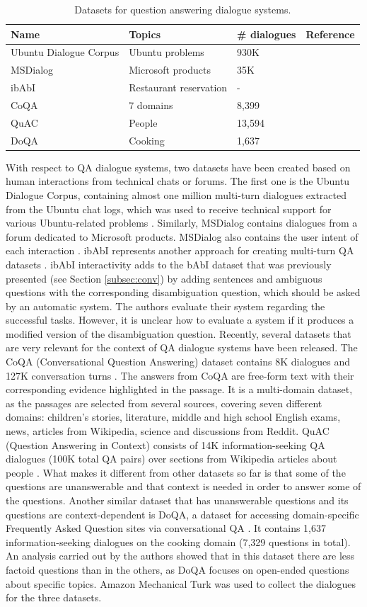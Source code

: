 \begin{table}[t]
\centering
\begin{tabular}{llll}
\hline
Name & Topics & \# dialogues   &  Reference\\ \hline
Ubuntu Dialogue Corpus & Ubuntu problems & 930K &  \\
MSDialog & Microsoft products & 35K &  \\
ibAbI & Restaurant reservation & - &  \\
CoQA &7 domains & 8,399 &  \\
QuAC & People & 13,594 &  \\
DoQA & Cooking & 1,637 &  \\
\hline
\end{tabular}
\caption{Datasets for question answering dialogue systems.}
\label{tab:qa}
\end{table}
With respect to QA dialogue systems, two datasets have been created based on human interactions from technical chats or forums. The first one is the Ubuntu Dialogue Corpus, containing almost one million multi-turn dialogues extracted from the Ubuntu chat logs, which was used to receive technical support for various Ubuntu-related problems . Similarly, MSDialog contains dialogues from a forum dedicated to Microsoft products. MSDialog also contains the user intent of each interaction .
ibAbI represents another approach for creating multi-turn QA datasets . ibAbI interactivity adds to the bAbI dataset that was previously presented (see Section \ref{subsec:conv}) by adding sentences and ambiguous questions with the corresponding disambiguation question, which should be asked by an automatic system. The authors evaluate their system regarding the successful tasks. However, it is unclear how to evaluate a system if it produces a modified version of the disambiguation question.
Recently, several datasets that are very relevant for the context of QA dialogue systems have been released. The CoQA (Conversational Question Answering) dataset contains 8K dialogues and 127K conversation turns . The answers from CoQA are free-form text with their corresponding evidence highlighted in the passage. It is a multi-domain dataset, as the passages are selected from several sources, covering seven different domains: children's stories, literature, middle and high school English exams, news, articles from Wikipedia, science and discussions from Reddit. QuAC (Question Answering in Context) consists of 14K information-seeking QA dialogues (100K total QA pairs) over sections from Wikipedia articles about people . What makes it different from other datasets so far is that some of the questions are unanswerable and that context is needed in order to answer some of the questions. Another similar dataset that has unanswerable questions and its questions are context-dependent is DoQA, a dataset for accessing domain-specific Frequently Asked Question sites via conversational QA . It contains 1,637 information-seeking dialogues on the cooking domain (7,329 questions in total). An analysis carried out by the authors showed that in this dataset there are less factoid questions than in the others, as DoQA focuses on open-ended questions about specific topics. Amazon Mechanical Turk was used to collect the dialogues for the three datasets.

